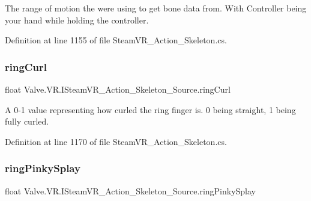 The range of motion the we\textquotesingle{}re using to get bone data from. With Controller being your hand while holding the controller. 



Definition at line 1155 of file Steam\+V\+R\+\_\+\+Action\+\_\+\+Skeleton.\+cs.

\mbox{\label{interface_valve_1_1_v_r_1_1_i_steam_v_r___action___skeleton___source_a06207e77ee749ea4db3b72bb24a3b62d}} 
\subsubsection{\texorpdfstring{ringCurl}{ringCurl}}
{\footnotesize\ttfamily float Valve.\+V\+R.\+I\+Steam\+V\+R\+\_\+\+Action\+\_\+\+Skeleton\+\_\+\+Source.\+ring\+Curl\hspace{0.3cm}{\ttfamily [get]}}



A 0-\/1 value representing how curled the ring finger is. 0 being straight, 1 being fully curled. 



Definition at line 1170 of file Steam\+V\+R\+\_\+\+Action\+\_\+\+Skeleton.\+cs.

\mbox{\label{interface_valve_1_1_v_r_1_1_i_steam_v_r___action___skeleton___source_a24d08a246cac735c6302a15479001eac}} 
\subsubsection{\texorpdfstring{ringPinkySplay}{ringPinkySplay}}
{\footnotesize\ttfamily float Valve.\+V\+R.\+I\+Steam\+V\+R\+\_\+\+Action\+\_\+\+Skeleton\+\_\+\+Source.\+ring\+Pinky\+Splay\hspace{0.3cm}{\ttfamily [get]}}



